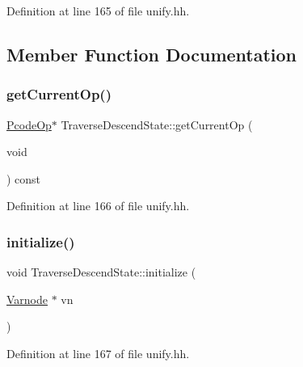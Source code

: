 Definition at line 165 of file unify.\+hh.



\subsection{Member Function Documentation}
\mbox{\label{class_traverse_descend_state_aad49b6319f29521faf5e70a38175aa5d}} 
\subsubsection{\texorpdfstring{getCurrentOp()}{getCurrentOp()}}
{\footnotesize\ttfamily \mbox{\hyperlink{class_pcode_op}{Pcode\+Op}}$\ast$ Traverse\+Descend\+State\+::get\+Current\+Op (\begin{DoxyParamCaption}\item[{void}]{ }\end{DoxyParamCaption}) const\hspace{0.3cm}{\ttfamily [inline]}}



Definition at line 166 of file unify.\+hh.

\mbox{\label{class_traverse_descend_state_abff13d38a3804c7199e1aee25003b010}} 
\subsubsection{\texorpdfstring{initialize()}{initialize()}}
{\footnotesize\ttfamily void Traverse\+Descend\+State\+::initialize (\begin{DoxyParamCaption}\item[{\mbox{\hyperlink{class_varnode}{Varnode}} $\ast$}]{vn }\end{DoxyParamCaption})\hspace{0.3cm}{\ttfamily [inline]}}



Definition at line 167 of file unify.\+hh.

\mbox{\label{class_traverse_descend_state_ab99061b4d55c4a27bd920ca6a08fa051}} 
